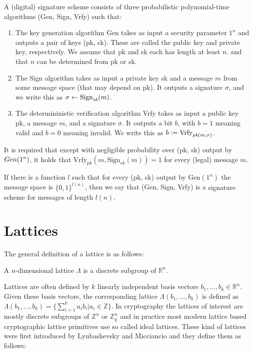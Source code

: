 \begin{definition}
A \textnormal{(digital) signature scheme} consists of three probabilistic polynomial-time algorithms \textnormal{(Gen, Sign, Vrfy)} such that:
\begin{enumerate}
    \item The \textnormal{key generation algorithm Gen} takes as input a security parameter $1^n$ and outputs a pair of keys (pk, sk). These are called the \textnormal{public key} and \textnormal{private key}, respectively. We assume that pk and sk each has length at least $n$. and that $n$ can be determined from pk or sk.
    
    \item The \textnormal{Sign algorithm} takes as input a private key sk and a message $m$ from some message space (that may depend on pk). It outputs a signature $\sigma$, and we write this as $\sigma \leftarrow \textnormal{Sign}_{\textit{sk}}(m)$. 
    
    \item The determininistic \textnormal{verification algorithm Vrfy} takes as input a public key pk, a message $m$, and a signature $\sigma$. It outputs a bit $b$, with $b = 1$ meaning \textnormal{valid} and $b = 0$ meaning \textnormal{invalid}. We write this as $b := \textnormal{Vrfy}_{\textit{pk}(m, \sigma)}$.
\end{enumerate}
It is required that except with negligible probability over (pk, sk) output by $\textnormal{}{Gen}(1^n)$, it holds that $\text{Vrfy}_{\textit{pk}}(m, \text{Sign}_{\textit{sk}}(m)) = 1$ for every (legal) message $m$.

If there is a function $l$ such that for every (pk, sk) output by $\text{Gen}(1^n)$ the message space is $\{0,1\}^{l(n)}$, then we say that \textnormal{(Gen, Sign, Vrfy)} is a \textnormal{signature scheme for messages of length $l(n)$}.
\end{definition}





\section{Lattices}
The general definition of a lattice is as follows:
\begin{definition}[Lattice]
A $n$-dimensional lattice $Λ$ is a discrete subgroup of $\mathds{R}^n$.
\end{definition}

Lattices are often defined by $k$ linearly independent basis vectors $b_1, \ldots, b_k \in \mathds{R}^n$.
Given these basis vectors, the corresponding lattice $Λ(b_1, \ldots, b_k)$ is defined as $Λ(b_1, \ldots, b_k) =  \{\sum_{i = 1}^k a_i b_i \vert a_i \in \mathds{Z}\}$.
In cryptography the lattices of interest are mostly discrete subgroups of $\mathds{Z}^n$ or $\mathds{Z}_q^n$ and in practice most modern lattice based cryptographic lattice primitives use so called ideal lattices. These kind of lattices were first introduced by Lyubashevsky and Micciancio \cite[p.~149]{idealdef} and they define them as follows:


